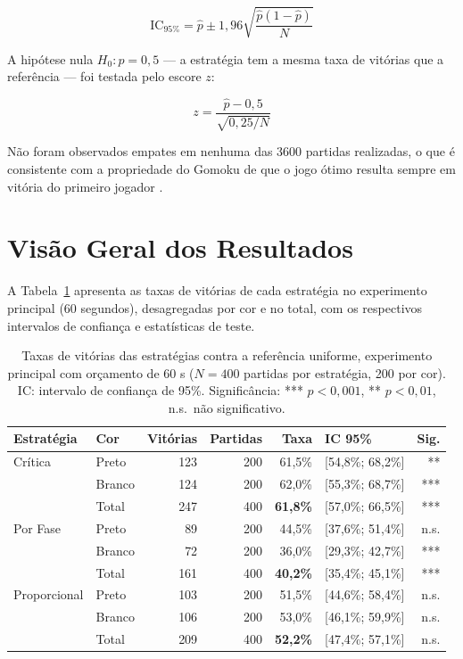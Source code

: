 \documentclass[cic,tc]{iiufrgs}
\begin{document}
\begin{equation}
    \text{IC}_{95\%} = \hat{p} \pm 1{,}96 \sqrt{\frac{\hat{p}(1-\hat{p})}{N}}
\label{eq:ci}
\end{equation}

A hipótese nula $H_0\colon p = 0{,}5$ — a estratégia tem a mesma taxa de vitórias que a referência — foi testada pelo escore $z$:

\begin{equation}
    z = \frac{\hat{p} - 0{,}5}{\sqrt{0{,}25/N}}
\label{eq:ztest}
\end{equation}

Não foram observados empates em nenhuma das 3600 partidas realizadas, o que é consistente com a propriedade do Gomoku de que o jogo ótimo resulta sempre em vitória do primeiro jogador \cite{allis1994searching}.

\section{Visão Geral dos Resultados}
\label{sec:results_overview}

A Tabela~\ref{tab:results_main} apresenta as taxas de vitórias de cada estratégia no experimento principal (60 segundos), desagregadas por cor e no total, com os respectivos intervalos de confiança e estatísticas de teste.

\begin{table}[htbp]
    \centering
    \caption{Taxas de vitórias das estratégias contra a referência uniforme, experimento principal com orçamento de 60 s ($N = 400$ partidas por estratégia, 200 por cor). IC: intervalo de confiança de 95\%. Significância: *** $p < 0{,}001$, ** $p < 0{,}01$, n.s.\ não significativo.}
    \label{tab:results_main}
    \begin{tabular}{llrrrlr}
        \hline
        \textbf{Estratégia} & \textbf{Cor} & \textbf{Vitórias} & \textbf{Partidas} & \textbf{Taxa} & \textbf{IC 95\%} & \textbf{Sig.} \\
        \hline
        Crítica      & Preto & 123 & 200 & 61,5\% & [54,8\%; 68,2\%] & **  \\
                     & Branco & 124 & 200 & 62,0\% & [55,3\%; 68,7\%] & *** \\
                     & Total & 247 & 400 & \textbf{61,8\%} & [57,0\%; 66,5\%] & *** \\
        \hline
        Por Fase     & Preto &  89 & 200 & 44,5\% & [37,6\%; 51,4\%] & n.s.\\
                     & Branco &  72 & 200 & 36,0\% & [29,3\%; 42,7\%] & *** \\
                     & Total & 161 & 400 & \textbf{40,2\%} & [35,4\%; 45,1\%] & *** \\
        \hline
        Proporcional & Preto & 103 & 200 & 51,5\% & [44,6\%; 58,4\%] & n.s.\\
                     & Branco & 106 & 200 & 53,0\% & [46,1\%; 59,9\%] & n.s.\\
                     & Total & 209 & 400 & \textbf{52,2\%} & [47,4\%; 57,1\%] & n.s.\\
        \hline
    \end{tabular}
\end{table}
\end{document}
